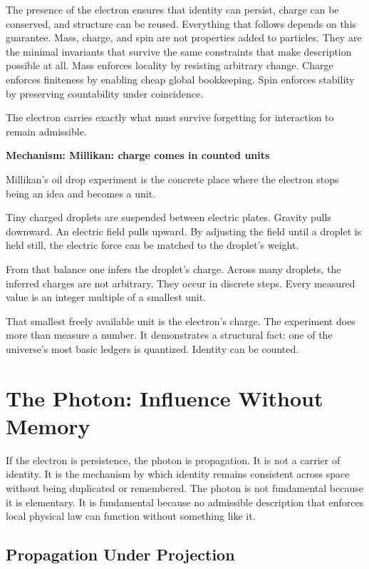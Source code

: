 \documentclass[11pt,twoside,openright]{book}
\newenvironment{mechanismboxpage}[1]
  {\par\medskip
   \noindent
   \begin{minipage}{\linewidth}
   \begin{framed}
   \noindent\textbf{Mechanism: #1}\par\medskip}
  {\end{framed}
   \end{minipage}
   \par\medskip}
\begin{document}
The presence of the electron ensures that identity can persist, charge can be conserved, and structure can be reused. Everything that follows depends on this guarantee. Mass, charge, and spin are not properties added to particles. They are the minimal invariants that survive the same constraints that make description possible at all. Mass enforces locality by resisting arbitrary change. Charge enforces finiteness by enabling cheap global bookkeeping. Spin enforces stability by preserving countability under coincidence.

The electron carries exactly what must survive forgetting
for interaction to remain admissible.
 
\begin{mechanismboxpage}{Millikan: charge comes in counted units}
Millikan's oil drop experiment is the concrete place where the electron stops being an idea and becomes a unit.

Tiny charged droplets are suspended between electric plates. Gravity pulls downward. An electric field pulls upward. By adjusting the field until a droplet is held still, the electric force can be matched to the droplet's weight.

From that balance one infers the droplet's charge. Across many droplets, the inferred charges are not arbitrary. They occur in discrete steps. Every measured value is an integer multiple of a smallest unit.

That smallest freely available unit is the electron's charge.
The experiment does more than measure a number.
It demonstrates a structural fact: one of the universe's most basic ledgers is quantized.
Identity can be counted.
\end{mechanismboxpage}
\chapter{The Photon: Influence Without Memory}

If the electron is persistence, the photon is propagation. It is not a carrier of identity. It is the mechanism by which identity remains consistent across space without being duplicated or remembered. The photon is not fundamental because it is elementary. It is fundamental because no admissible description that enforces local physical law can function without something like it.

\section*{Propagation Under Projection}
\end{document}
